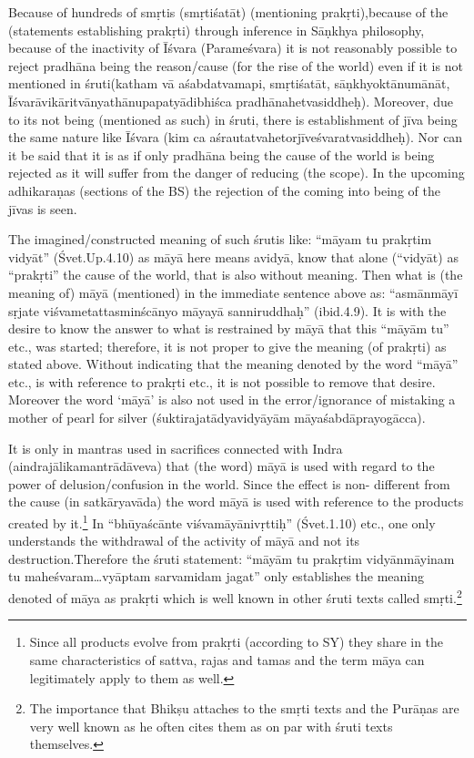 Because of hundreds of smṛtis (smṛtiśatāt) (mentioning prakṛti),\break because of the (statements establishing prakṛti) through inference in Sāṇkhya philosophy, because of the inactivity of Īśvara (Parameśvara) it is not reasonably possible to reject pradhāna being the reason/cause (for the rise of the world) even if it is not mentioned in śruti(katham vā aśabdatvamapi, smṛtiśatāt, sāṇkhyoktānumānāt, Īśvarāvikāritvānya\-thānupapatyādibhiśca pradhānahetvasiddheḥ). Moreover, due to its not being (mentioned as such) in śruti, there is establishment of jīva being the same nature like Īśvara (kim ca aśrautatvahetorjīveśvaratvasiddheḥ). Nor can it be said that it is as if only pradhāna being the cause of the world is being rejected as it will suffer from the danger of reducing (the scope). In the upcoming adhikaraṇas (sections of the BS) the rejection of the coming into being of the jīvas is seen.

The imagined/constructed meaning of such śrutis like: “māyam tu prakṛtim vidyāt” (Śvet.Up.4.10)  as māyā here means avidyā, know that alone (“vidyāt) as “prakṛti” the cause of the world, that is also without meaning. Then what is (the meaning of) māyā (mentioned) in the immediate sentence above as: “asmānmāyī sṛjate viśvametattasminścānyo māyayā sanniruddhaḥ” (ibid.4.9). It is with the desire to know the answer to what is restrained by māyā that this “māyām tu” etc., was started; therefore, it is not proper to give the meaning (of prakṛti) as stated above. Without indicating that the meaning denoted by the word “māyā” etc., is with reference to prakṛti etc., it is not possible to remove that desire. Moreover the word ‘māyā’ is also not used in the error/ignorance of mistaking a mother of pearl for silver (śuktirajatādyavidyāyām māyaśabdāprayogācca).

It is only in mantras used in sacrifices connected with Indra (aindrajālikamantrādāveva) that (the word) māyā is used with regard to the power of delusion/confusion in the world. Since the effect is non- different from the cause (in satkāryavāda) the word māyā is used with reference to the products created by it.\footnote{Since all products evolve from prakṛti (according to SY) they share in the same characteristics of sattva, rajas and tamas and the  term māya can legitimately apply to them as well.} In “bhūyaścānte viśvamāyānivṛttiḥ” (Śvet.1.10) etc., one only understands the withdrawal of the activity of māyā and not its destruction.Therefore the śruti statement: “māyām tu prakṛtim vidyānmāyinam tu maheśvaram…vyāptam sarvamidam jagat” only establishes the meaning denoted of māya as prakṛti which is well known in other śruti texts called smṛti.\footnote{The importance that Bhikṣu attaches to the smṛti texts and the Purāṇas are very well known as he often cites them as on par with śruti texts themselves.}

